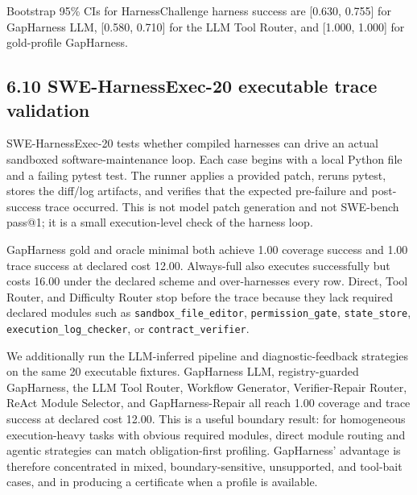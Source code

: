 \documentclass[
  10pt,
]{article}
\begin{document}
Bootstrap 95\% CIs for HarnessChallenge harness success are {[}0.630,
0.755{]} for GapHarness LLM, {[}0.580, 0.710{]} for the LLM Tool Router,
and {[}1.000, 1.000{]} for gold-profile GapHarness.

\subsection{6.10 SWE-HarnessExec-20 executable trace
validation}\label{swe-harnessexec-20-executable-trace-validation}

SWE-HarnessExec-20 tests whether compiled harnesses can drive an actual
sandboxed software-maintenance loop. Each case begins with a local
Python file and a failing pytest test. The runner applies a provided
patch, reruns pytest, stores the diff/log artifacts, and verifies that
the expected pre-failure and post-success trace occurred. This is not
model patch generation and not SWE-bench pass@1; it is a small
execution-level check of the harness loop.

GapHarness gold and oracle minimal both achieve 1.00 coverage success
and 1.00 trace success at declared cost 12.00. Always-full also executes
successfully but costs 16.00 under the declared scheme and
over-harnesses every row. Direct, Tool Router, and Difficulty Router
stop before the trace because they lack required declared modules such
as \texttt{sandbox\_file\_editor}, \texttt{permission\_gate},
\texttt{state\_store}, \texttt{execution\_log\_checker}, or
\texttt{contract\_verifier}.

We additionally run the LLM-inferred pipeline and diagnostic-feedback
strategies on the same 20 executable fixtures. GapHarness LLM,
registry-guarded GapHarness, the LLM Tool Router, Workflow Generator,
Verifier-Repair Router, ReAct Module Selector, and GapHarness-Repair all
reach 1.00 coverage and trace success at declared cost 12.00. This is a
useful boundary result: for homogeneous execution-heavy tasks with
obvious required modules, direct module routing and agentic strategies
can match obligation-first profiling. GapHarness' advantage is therefore
concentrated in mixed, boundary-sensitive, unsupported, and tool-bait
cases, and in producing a certificate when a profile is available.
\end{document}
